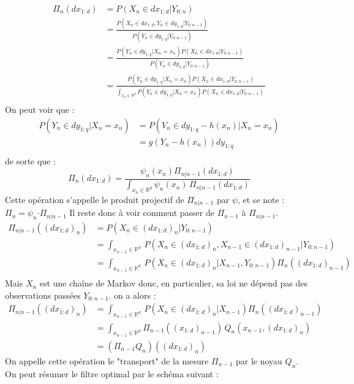\documentclass{article}
\begin{document}
\begin{align*}
   \Pi_n(dx_{1:d}) &=P(X_n \in dx_{1:d} \vert Y_{0:n})\\
                  &=\frac{P(X_n \in dx_{1:d}, Y_n \in dy_{1:q} \vert Y_{0:n-1})}
                  {P(Y_n \in dy_{1:q} \vert Y_{0:n-1})}\\
                  &= \frac{P(Y_n \in dy_{1:q} \vert X_n = x_n)P(X_n \in dx_{1:d} \vert Y_{0:n-1})}
                  {P(Y_n \in dy_{1:q} \vert Y_{0:n-1})}\\
                  &= \frac{P(Y_n \in dy_{1:q} \vert X_n = x_n)P(X_n \in dx_{1:d} \vert Y_{0:n-1})}
                  {\displaystyle{\int_{x_n \in \mathbb{R}^d} P(Y_n \in dy_{1:q} \vert X_n = x_n)P(X_n \in dx_{1:d} \vert Y_{0:n-1}) \, }}\\
\end{align*}
On peut voir que : 
\begin{align*}
   P(Y_n \in dy_{1:q} \vert X_n =x_n)&=P(V_n \in dy_{1:q}-h(x_n) \vert X_n = x_n)\\
   &=g(Y_n-h(x_n))dy_{1:q}\\
\end{align*}
de sorte que : 
\[\Pi_n(dx_{1:d}) = \frac{\psi_n(x_n)\Pi_{n \vert n-1}(dx_{1:d})}{\displaystyle{\int_{x_n \in \mathbb{R}^d} \psi_n(x_n)\,\Pi_{n \vert n-1}(dx_{1:d})}}\]
Cette opération s'appelle le produit projectif de $\Pi_{n \vert n-1}$ par $\psi$, et se note : $\Pi_{n} = \psi_n \boldsymbol{\cdot} \Pi_{n \vert n-1}$
\newline
Il reste donc à voir comment passer de $\Pi_{n-1}$ à $\Pi_{n \vert n-1}$.
\begin{align*}
   \Pi_{n \vert n-1}((dx_{1:d})_n) &= P(X_n \in (dx_{1:d})_{n}\vert Y_{0:n-1})\\
   &=\displaystyle{\int_{x_{n-1}\in \mathbb{R}^d} \,P(X_n \in (dx_{1:d})_n,X_{n-1} \in (dx_{1:d})_{n-1} \vert Y_{0:n-1})}\\
   & = \displaystyle{\int_{x_{n-1}\in \mathbb{R}^d} \,
    P(X_n \in (dx_{1:d})_n \vert X_{n-1}, Y_{0:n-1}) 
    \Pi_{n}((dx_{1:d})_{n-1})}\\
\end{align*}
Mais $X_n$ est une chaîne de Markov donc, en particulier, sa loi ne dépend pas des observations passées $Y_{0:n-1}$. on a alors : 
\begin{align*}
   \Pi_{n \vert n-1}((dx_{1:d})_n) & =  \displaystyle{\int_{x_{n-1}\in \mathbb{R}^d} \,
   P(X_n \in (dx_{1:d})_n \vert X_{n-1}) 
   \Pi_{n}((dx_{1:d})_{n-1})}\\
   &=\displaystyle{\int_{x_{n-1}\in \mathbb{R}^d}\Pi_{n-1}((x_{1:d})_{n-1})\,Q_n(x_{n-1},(dx_{1:d})_n)}\\
   &=(\Pi_{n-1}Q_n)((dx_{1:d})_n)
\end{align*}
On appelle cette opération le "transport" de la mesure $\Pi_{n-1}$ par le noyau $Q_n$.
\\
On peut résumer le filtre optimal par le schéma suivant : 
\end{document}
